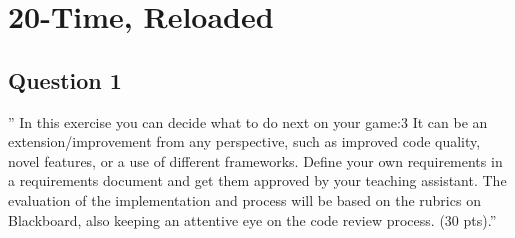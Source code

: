 \chapter{20-Time, Reloaded}
\section{Question 1}

'' In this exercise you can decide what to do next on your game:3
It can be an extension/improvement
from any perspective, such as improved code quality, novel features, or a use of different frameworks.
Define your own requirements in a requirements document and get them approved by your teaching
assistant. The evaluation of the implementation and process will be based on the rubrics on
Blackboard, also keeping an attentive eye on the code review process. (30 pts).''
